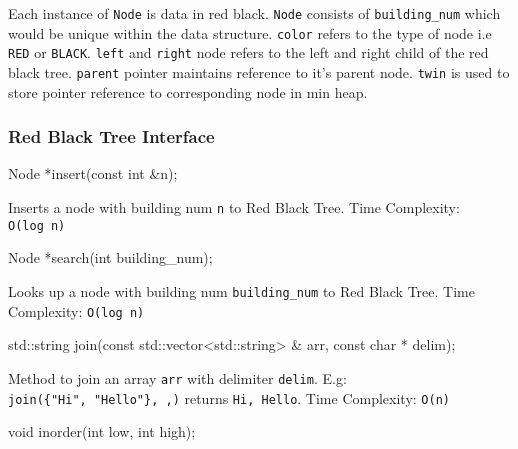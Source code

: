 \documentclass[
]{article}
\newenvironment{Shaded}{}{}
\newcommand{\AttributeTok}[1]{\textcolor[rgb]{0.49,0.56,0.16}{#1}}
\newcommand{\BuiltInTok}[1]{#1}
\newcommand{\DataTypeTok}[1]{\textcolor[rgb]{0.56,0.13,0.00}{#1}}
\newcommand{\NormalTok}[1]{#1}
\begin{document}
Each instance of \texttt{Node} is data in red black. \texttt{Node}
consists of \texttt{building\_num} which would be unique within the data
structure. \texttt{color} refers to the type of node i.e \texttt{RED} or
\texttt{BLACK}. \texttt{left} and \texttt{right} node refers to the left
and right child of the red black tree. \texttt{parent} pointer maintains
reference to it's parent node. \texttt{twin} is used to store pointer
reference to corresponding node in min heap.

\hypertarget{red-black-tree-interface}{%
\subsubsection{Red Black Tree
Interface}\label{red-black-tree-interface}}

\begin{Shaded}
\begin{Highlighting}[]
\NormalTok{Node *insert(}\AttributeTok{const} \DataTypeTok{int}\NormalTok{ &n);}
\end{Highlighting}
\end{Shaded}

Inserts a node with building num \texttt{n} to Red Black Tree. Time
Complexity: \texttt{O(log\ n)}

\begin{Shaded}
\begin{Highlighting}[]
\NormalTok{Node *search(}\DataTypeTok{int}\NormalTok{ building_num);}
\end{Highlighting}
\end{Shaded}

Looks up a node with building num \texttt{building\_num} to Red Black
Tree. Time Complexity: \texttt{O(log\ n)}

\begin{Shaded}
\begin{Highlighting}[]
\BuiltInTok{std::}\NormalTok{string join(}\AttributeTok{const} \BuiltInTok{std::}\NormalTok{vector<}\BuiltInTok{std::}\NormalTok{string> & arr, }\AttributeTok{const} \DataTypeTok{char}\NormalTok{ * delim);}
\end{Highlighting}
\end{Shaded}

Method to join an array \texttt{arr} with delimiter \texttt{delim}. E.g:
\texttt{join(\{"Hi",\ "Hello"\},\ \textquotesingle{},\textquotesingle{})}
returns \texttt{Hi,\ Hello}. Time Complexity: \texttt{O(n)}

\begin{Shaded}
\begin{Highlighting}[]
\DataTypeTok{void}\NormalTok{ inorder(}\DataTypeTok{int}\NormalTok{ low, }\DataTypeTok{int}\NormalTok{ high);}
\end{Highlighting}
\end{Shaded}
\end{document}
